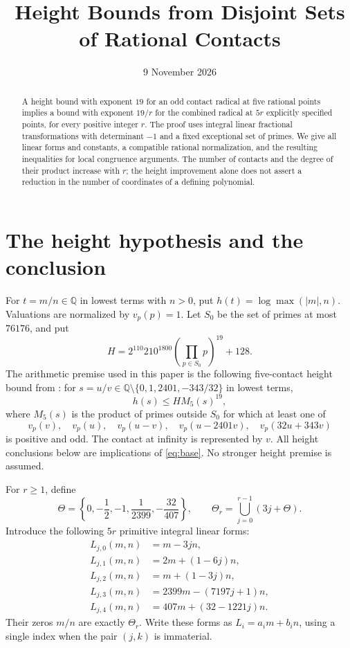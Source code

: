 \documentclass[11pt,a4paper]{article}
\title{Height Bounds from Disjoint Sets of Rational Contacts}
\author{}\date{9 November 2026}
\theoremstyle{definition}\newtheorem{definition}[theorem]{Definition}
\newcommand{\Q}{\mathbb Q}\newcommand{\Z}{\mathbb Z}
\begin{document}
\maketitle
\begin{abstract}
A height bound with exponent $19$ for an odd contact radical at five
rational points implies a bound with exponent $19/r$ for the combined
radical at $5r$ explicitly specified points, for every positive integer
$r$. The proof uses integral linear fractional transformations with
determinant $-1$ and a fixed exceptional set of primes. We give all
linear forms and constants, a compatible rational normalization, and
the resulting inequalities for local congruence arguments. The number
of contacts and the degree of their product increase with $r$; the
height improvement alone does not assert a reduction in the number of
coordinates of a defining polynomial.
\end{abstract}

\section{The height hypothesis and the conclusion}

For $t=m/n\in\Q$ in lowest terms with $n>0$, put
$h(t)=\log\max(|m|,n)$. Valuations are normalized by $v_p(p)=1$.
Let $S_0$ be the set of primes at most $76176$, and put
\[
 H=2^{110}210^{1800}\left(\prod_{p\in S_0}p\right)^{19}+128.
\]
The arithmetic premise used in this paper is the following five-contact
height bound from \cite[Theorem \texttt{quartic-height19}]{Glazer}:
for $s=u/v\in\Q\setminus\{0,1,2401,-343/32\}$ in lowest terms,
\begin{equation}\label{eq:base}
 h(s)\le H M_5(s)^{19},
\end{equation}
where $M_5(s)$ is the product of primes outside $S_0$ for which at
least one of
\[
 v_p(v),\quad v_p(u),\quad v_p(u-v),\quad
 v_p(u-2401v),\quad v_p(32u+343v)
\]
is positive and odd. The contact at infinity is represented by $v$.
All height conclusions below are implications of \eqref{eq:base}.
No stronger height premise is assumed.

For $r\ge1$, define
\[
 \Theta=\left\{0,-\frac12,-1,\frac1{2399},-\frac{32}{407}\right\},
 \qquad \Theta_r=\bigcup_{j=0}^{r-1}(3j+\Theta).
\]
Introduce the following $5r$ primitive integral linear forms:
\begin{align*}
 L_{j,0}(m,n)&=m-3jn,\\
 L_{j,1}(m,n)&=2m+(1-6j)n,\\
 L_{j,2}(m,n)&=m+(1-3j)n,\\
 L_{j,3}(m,n)&=2399m-(7197j+1)n,\\
 L_{j,4}(m,n)&=407m+(32-1221j)n.
\end{align*}
Their zeros $m/n$ are exactly $\Theta_r$.
Write these forms as $L_i=a_i m+b_i n$, using a single index when
the pair $(j,k)$ is immaterial.
\end{document}
